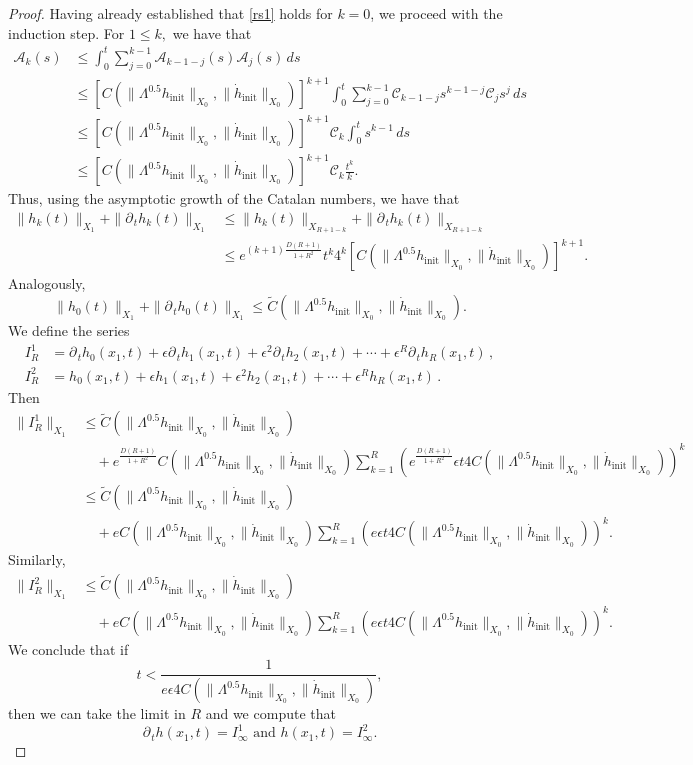 \documentclass[11pt]{article}
\theoremstyle{plain}
\theoremstyle{definition}
\theoremstyle{definition}
\def\p{\text{\bf\emph{p}}}
\def\p{{\partial\hspace{1pt}}}
\def\hinit{h_{\operatorname{init}}}
\def\htinit{{\dot h}_{\operatorname{init}}}
\begin{document}
\begin{proof}
Having already established that \eqref{rs1} holds for $k=0$, we proceed with the induction step. For $1\leq k,$ we have that
\begin{align*}
\mathscr{A}_k(s)&\leq\int_0^t \sum_{j=0}^{k-1} \mathscr{A}_{k-1-j}(s)\mathscr{A}_{j}(s) \,ds\\
&\leq \left[C(\|\Lambda^{0.5}\hinit\|_{X_0},\|\htinit\|_{X_0})\right]^{k+1}\int_0^t \sum_{j=0}^{k-1}  \mathcal{C}_{k-1-j}s^{k-1-j} \mathcal{C}_{j}s^{j} \,ds\\
&\leq \left[C(\|\Lambda^{0.5}\hinit\|_{X_0},\|\htinit\|_{X_0})\right]^{k+1}\mathcal{C}_k\int_0^t s^{k-1} \,ds\\
&\leq \left[C(\|\Lambda^{0.5}\hinit\|_{X_0},\|\htinit\|_{X_0})\right]^{k+1}\mathcal{C}_k\frac{t^k}{k}.
\end{align*}
Thus, using the asymptotic growth of the Catalan numbers, we have that
\begin{align*}
\| h_k(t)\|_{X_{1}}+\|\p_{\!t} h_k(t)\|_{X_{1}}&\leq\|h_k(t)\|_{X_{R+1-k}}+\|\p_{\!t} h_k(t)\|_{X_{R+1-k}}\\
&\leq e^{(k+1)\frac{D(R+1)}{1+R^2}}t^k4^k \left[C(\|\Lambda^{0.5}\hinit\|_{X_0},\|\htinit\|_{X_0})\right]^{k+1}.
\end{align*}
Analogously,
$$
\|h_0(t)\|_{X_{1}}+\|\p_{\!t} h_0(t)\|_{X_{1}}\leq \widetilde{C}(\|\Lambda^{0.5}\hinit\|_{X_0},\|\htinit\|_{X_0}).
$$
We define the series
\begin{align*}
I^1_R&= \p_{\!t} h_0(x_1,t) + \epsilon \p_{\!t}h_1(x_1,t) +\epsilon^2 \p_{\!t}h_2(x_1,t) + \cdots + \epsilon^R \p_{\!t}h_R(x_1,t)\,, \\
I^2_R&= h_0(x_1,t) + \epsilon h_1(x_1,t) +\epsilon^2 h_2(x_1,t) + \cdots + \epsilon^R h_R(x_1,t)\,.
\end{align*}
Then
\begin{align*}
\|I^1_R\|_{X_1}&\leq \widetilde{C}(\|\Lambda^{0.5}\hinit\|_{X_0},\|\htinit\|_{X_0})\\
&\quad+e^{\frac{D(R+1)}{1+R^2}}C(\|\Lambda^{0.5}\hinit\|_{X_0},\|\htinit\|_{X_0})\sum_{k=1}^R\left(e^{\frac{D(R+1)}{1+R^2}}\epsilon t 4 C(\|\Lambda^{0.5}\hinit\|_{X_0},\|\htinit\|_{X_0})\right)^k\\
&\leq \widetilde{C}(\|\Lambda^{0.5}\hinit\|_{X_0},\|\htinit\|_{X_0})\\
&\quad+e C(\|\Lambda^{0.5}\hinit\|_{X_0},\|\htinit\|_{X_0})\sum_{k=1}^R\left(e\epsilon t 4 C(\|\Lambda^{0.5}\hinit\|_{X_0},\|\htinit\|_{X_0})\right)^k.
\end{align*}
Similarly,
\begin{align*}
\|I^2_R\|_{X_1}&\leq \widetilde{C}(\|\Lambda^{0.5}\hinit\|_{X_0},\|\htinit\|_{X_0})\\
&\quad+eC(\|\Lambda^{0.5}\hinit\|_{X_0},\|\htinit\|_{X_0})\sum_{k=1}^R\left(e\epsilon t 4 C(\|\Lambda^{0.5}\hinit\|_{X_0},\|\htinit\|_{X_0})\right)^k.
\end{align*}
We conclude that if
$$
t<\frac{1}{e \epsilon 4C(\|\Lambda^{0.5}\hinit\|_{X_0},\|\htinit\|_{X_0})},
$$
then we can take the limit in $R$ and we compute that
$$
\p_{\!t}h(x_1,t)=I^1_\infty\text{ \ and \ } h(x_1,t)=I^2_\infty.
$$


\end{proof}
\end{document}
